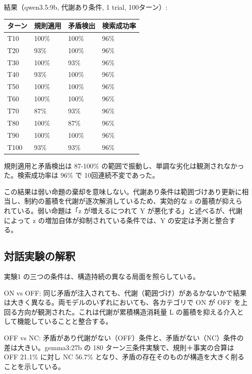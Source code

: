 \documentclass[12pt,a4paper]{article}
\begin{document}
結果（qwen3.5:9b, 代謝あり条件, 1 trial, 100ターン）:

{\def\LTcaptype{table} %
\begin{longtable}[]{@{}llll@{}}
\toprule\noalign{}
ターン & 規則適用 & 矛盾検出 & 検索成功率 \\
\midrule\noalign{}
\endhead
\bottomrule\noalign{}
\endlastfoot
T10 & 100\% & 100\% & 96\% \\
T20 & 93\% & 100\% & 96\% \\
T30 & 100\% & 93\% & 96\% \\
T40 & 93\% & 100\% & 96\% \\
T50 & 100\% & 100\% & 96\% \\
T60 & 100\% & 100\% & 96\% \\
T70 & 87\% & 93\% & 96\% \\
T80 & 100\% & 87\% & 96\% \\
T90 & 100\% & 100\% & 96\% \\
T100 & 93\% & 93\% & 96\% \\
\end{longtable}
}

規則適用と矛盾検出は 87-100\% の範囲で振動し、単調な劣化は観測されなかった。検索成功率は 96\% で 10回連続不変であった。

この結果は弱い命題の棄却を意味しない。代謝あり条件は範囲づけあり更新に相当し、制約の蓄積を代謝が逐次解消しているため、実効的な z の蓄積が抑えられている。弱い命題は「z が増えるにつれて Y が悪化する」と述べるが、代謝によって z の増加自体が抑制されている条件では、Y の安定は予測と整合する。

\subsection{対話実験の解釈}\label{ux5bfeux8a71ux5b9fux9a13ux306eux89e3ux91c8}

実験1 の三つの条件は、構造持続の異なる局面を照らしている。

ON vs OFF: 同じ矛盾が注入されても、代謝（範囲づけ）があるかないかで結果は大きく異なる。両モデルのいずれにおいても、各カテゴリで ON が OFF を上回る方向が観測された。これは代謝が累積構造消耗量 L の蓄積を抑える介入として機能していることと整合する。

OFF vs NC: 矛盾があり代謝がない（OFF）条件と、矛盾がない（NC）条件の差は大きい。gemma3:27b の 180 ターン三条件実験で、規則＋事実の合算は OFF 21.1\% に対し NC 56.7\% となり、矛盾の存在そのものが構造を大きく削ることを示している。
\end{document}
